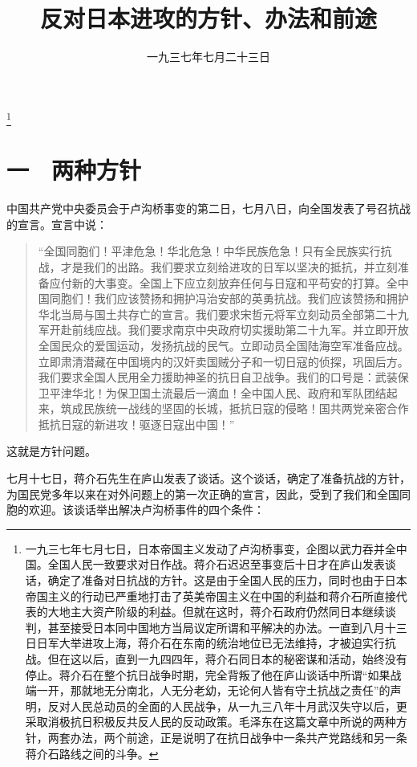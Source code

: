
\title{反对日本进攻的方针、办法和前途}
\date{一九三七年七月二十三日}
\thanks{一九三七年七月七日，日本帝国主义发动了卢沟桥事变，企图以武力吞并全中国。全国人民一致要求对日作战。蒋介石迟迟至事变后十日才在庐山发表谈话，确定了准备对日抗战的方针。这是由于全国人民的压力，同时也由于日本帝国主义的行动已严重地打击了英美帝国主义在中国的利益和蒋介石所直接代表的大地主大资产阶级的利益。但就在这时，蒋介石政府仍然同日本继续谈判，甚至接受日本同中国地方当局议定所谓和平解决的办法。一直到八月十三日日军大举进攻上海，蒋介石在东南的统治地位已无法维持，才被迫实行抗战。但在这以后，直到一九四四年，蒋介石同日本的秘密谋和活动，始终没有停止。蒋介石在整个抗日战争时期，完全背叛了他在庐山谈话中所谓“如果战端一开，那就地无分南北，人无分老幼，无论何人皆有守土抗战之责任”的声明，反对人民总动员的全面的人民战争，从一九三八年十月武汉失守以后，更采取消极抗日积极反共反人民的反动政策。毛泽东在这篇文章中所说的两种方针，两套办法，两个前途，正是说明了在抗日战争中一条共产党路线和另一条蒋介石路线之间的斗争。}
\maketitle


\section{一　两种方针}

中国共产党中央委员会于卢沟桥事变的第二日，七月八日，向全国发表了号召抗战的宣言。宣言中说：

\begin{quote}
“全国同胞们！平津危急！华北危急！中华民族危急！只有全民族实行抗战，才是我们的出路。我们要求立刻给进攻的日军以坚决的抵抗，并立刻准备应付新的大事变。全国上下应立刻放弃任何与日寇和平苟安的打算。全中国同胞们！我们应该赞扬和拥护冯治安部的英勇抗战。我们应该赞扬和拥护华北当局与国土共存亡的宣言。我们要求宋哲元将军立刻动员全部第二十九军开赴前线应战。我们要求南京中央政府切实援助第二十九军。并立即开放全国民众的爱国运动，发扬抗战的民气。立即动员全国陆海空军准备应战。立即肃清潜藏在中国境内的汉奸卖国贼分子和一切日寇的侦探，巩固后方。我们要求全国人民用全力援助神圣的抗日自卫战争。我们的口号是：武装保卫平津华北！为保卫国土流最后一滴血！全中国人民、政府和军队团结起来，筑成民族统一战线的坚固的长城，抵抗日寇的侵略！国共两党亲密合作抵抗日寇的新进攻！驱逐日寇出中国！”
\end{quote}

这就是方针问题。

七月十七日，蒋介石先生在庐山发表了谈话。这个谈话，确定了准备抗战的方针，为国民党多年以来在对外问题上的第一次正确的宣言，因此，受到了我们和全国同胞的欢迎。该谈话举出解决卢沟桥事件的四个条件：

